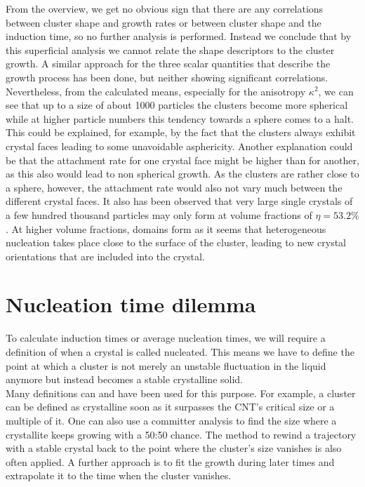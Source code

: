 From the overview, we get no obvious sign that there are any correlations between cluster shape and growth rates or between cluster shape and the induction time, so no further analysis is performed. Instead we conclude that by this superficial analysis we cannot relate the shape descriptors to the cluster growth. A similar approach for the three scalar quantities that describe the growth process has been done, but neither showing significant correlations.\\  

Nevertheless, from the calculated means, especially for the anisotropy $\kappa^2$, we can see that up to a size of about 1000 particles the clusters become more spherical while at higher particle numbers this tendency towards a sphere comes to a halt. This could be explained, for example, by the fact that the clusters always exhibit crystal faces leading to some unavoidable asphericity. Another explanation could be that the attachment rate for one crystal face might be higher than for another, as this also would lead to non spherical growth. As the clusters are rather close to a sphere, however, the attachment rate would also not vary much between the different crystal faces. It also has been observed that very large single crystals of a few hundred thousand particles may only form at volume fractions of $\eta = 53.2 \%$. At higher volume fractions, domains form as it seems that heterogeneous nucleation takes place close to the surface of the cluster, leading to new crystal orientations that are included into the crystal.

\section{Nucleation time dilemma}
\label{sec:nucleation_times}
To calculate induction times or average nucleation times, we will require a definition of when a crystal is called nucleated. This means we have to define the point at which a cluster is not merely an unstable fluctuation in the liquid anymore but instead becomes a stable crystalline solid.\\
Many definitions can and have been used for this purpose. For example, a cluster can be defined as crystalline soon as it surpasses the CNT's critical size or a multiple of it. One can also use a committer analysis to find the size where a crystallite keeps growing with a 50:50 chance. The method to rewind a trajectory with a stable crystal back to the point where the cluster's size vanishes is also often applied. A further approach is to fit the growth during later times and extrapolate it to the time when the cluster vanishes.\\

